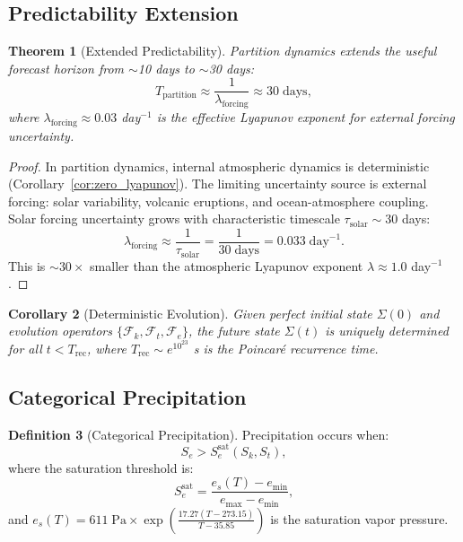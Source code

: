 \documentclass[twocolumn,10pt]{article}
\newtheorem{theorem}{Theorem}[section]
\newtheorem{corollary}[theorem]{Corollary}
\theoremstyle{definition}
\newtheorem{definition}[theorem]{Definition}
\newcommand{\Sk}{S_k}
\newcommand{\St}{S_t}
\newcommand{\Se}{S_e}
\begin{document}
\subsection{Predictability Extension}

\begin{theorem}[Extended Predictability]\label{thm:extended_predict}
Partition dynamics extends the useful forecast horizon from $\sim$10 days to $\sim$30 days:
\begin{equation}\label{eq:extended_predict}
    T_{\mathrm{partition}} \approx \frac{1}{\lambda_{\mathrm{forcing}}} \approx 30\;\text{days},
\end{equation}
where $\lambda_{\mathrm{forcing}} \approx 0.03$ day$^{-1}$ is the effective Lyapunov exponent for external forcing uncertainty.
\end{theorem}

\begin{proof}
In partition dynamics, internal atmospheric dynamics is deterministic (Corollary~\ref{cor:zero_lyapunov}). The limiting uncertainty source is external forcing: solar variability, volcanic eruptions, and ocean-atmosphere coupling. Solar forcing uncertainty grows with characteristic timescale $\tau_{\mathrm{solar}} \sim 30$ days:
\begin{equation}
    \lambda_{\mathrm{forcing}} \approx \frac{1}{\tau_{\mathrm{solar}}} = \frac{1}{30\;\text{days}} = 0.033\;\text{day}^{-1}.
\end{equation}
This is $\sim 30\times$ smaller than the atmospheric Lyapunov exponent $\lambda \approx 1.0$ day$^{-1}$.
\end{proof}

\begin{corollary}[Deterministic Evolution]\label{cor:deterministic}
Given perfect initial state $\Sigma(0)$ and evolution operators $\{\mathcal{F}_k, \mathcal{F}_t, \mathcal{F}_e\}$, the future state $\Sigma(t)$ is uniquely determined for all $t < T_{\mathrm{rec}}$, where $T_{\mathrm{rec}} \sim e^{10^{23}}$ s is the Poincar\'e recurrence time.
\end{corollary}

\subsection{Categorical Precipitation}

\begin{definition}[Categorical Precipitation]\label{def:precip}
Precipitation occurs when:
\begin{equation}\label{eq:precip_condition}
    \Se > \Se^{\mathrm{sat}}(\Sk, \St),
\end{equation}
where the saturation threshold is:
\begin{equation}
    \Se^{\mathrm{sat}} = \frac{e_s(T) - e_{\min}}{e_{\max} - e_{\min}},
\end{equation}
and $e_s(T) = 611\;\text{Pa}\times\exp\!\left(\frac{17.27(T - 273.15)}{T - 35.85}\right)$ is the saturation vapor pressure.
\end{definition}
\end{document}
